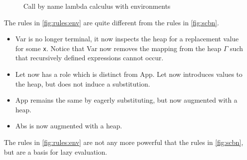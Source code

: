 \begin{figure}[ht]
\begin{mdframed}[style=bigbox]
\begin{subfigure}[b]{1\textwidth}
        \end{subfigure}
        \begin{subfigure}[b]{1\textwidth}
          \vspace*{0.4cm}
            \begin{prooftree}
            \end{prooftree}   
            \caption{}
          \label{fig:rules:env:var}
        \end{subfigure}
    \end{mdframed}
    \caption{Call by name lambda calculus with environments}
    \label{fig:rules:env}
\end{figure}
The rules in \autoref{fig:rules:env} are quite different from the rules in \autoref{fig:scbn}.
\begin{itemize}
  \item Var is no longer terminal, it now inspects the heap for a replacement value for some \texttt{x}.
    Notice that Var now removes the mapping from the heap $\Gamma$ such that recursively defined expressions cannot occur.
  \item Let now has a role which is distinct from App.
    Let now introduces values to the heap, but does not induce a substitution.
  \item App remains the same by eagerly substituting, but now augmented with a heap.
  \item Abs is now augmented with a heap.
\end{itemize}
The rules in \autoref{fig:rules:env} are not any more powerful that the rules in \autoref{fig:scbn}, but are a basis for lazy evaluation.

